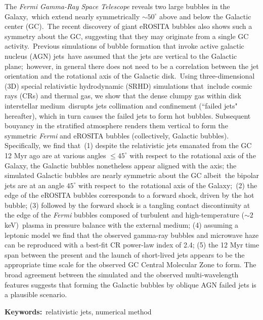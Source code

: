 \begin{abstracten}
The \textit{Fermi Gamma-Ray Space Telescope} reveals two large bubbles in the Galaxy,\
which extend nearly symmetrically $\sim50^{\circ}$ above and below the Galactic center (GC).\
The recent discovery of giant eROSITA bubbles also shows such a symmetry about the GC,
suggesting that they may originate from a single GC activity.\
Previous simulations of bubble formation that invoke active galactic nucleus (AGN) jets\
have assumed that the jets are vertical to the Galactic plane;\
however, in general there does not need to be a correlation between
the jet orientation and the rotational axis of the Galactic disk.\
Using three-dimensional (3D) special relativistic hydrodynamic (SRHD) simulations that\
include cosmic rays (CRs) and thermal gas, we show that the dense clumpy gas within disk interstellar medium\
disrupts jets collimation and confinement (``failed jets" hereafter),
which in turn causes the failed jets to form
hot bubbles. Subsequent bouyancy in the stratified atmosphere renders them vertical to form
the symmetric \textit{Fermi} and eROSITA bubbles (collectively, Galactic bubbles).
Specifically, we find that\
(1) despite the relativistic jets emanated from the GC 12 Myr ago are at various angles
$\leq 45^{\circ}$ with respect to
the rotational axis of the Galaxy, the Galactic bubbles nonetheless appear aligned with the axis;
the simulated Galactic bubbles are nearly symmetric about the GC albeit\
the bipolar jets are at an angle $45^{\circ}$ with respect to\
the rotational axis of the Galaxy;\
(2) the edge of the eROSITA bubbles corresponds to a forward shock, driven by the hot bubble;
(3) followed by the forward shock is a tangling contact discontinuity at the edge of the \textit{Fermi} bubbles
composed of turbulent and high-temperature ($\sim2$ keV)\
plasma in pressure balance with the external medium;
(4) assuming a leptonic model we find that the observed gamma-ray bubbles and microwave haze can be reproduced with
a best-fit CR power-law index of 2.4;
(5) the 12 Myr time span between the present and the launch of short-lived jets appears to be the appropriate time
scale for the observed GC Central Molecular Zone to form.
The broad agreement between the simulated and the
observed multi-wavelength features suggests that forming the Galactic bubbles by
oblique AGN failed jets is a plausible scenario.

\bigbreak
\noindent \textbf{Keywords:}{\, \makeatletter relativistic jets, numerical method \makeatother}
\end{abstracten}

\begin{comment}
\category{I2.10}{Computing Methodologies}{Artificial Intelligence --
Vision and Scene Understanding} \category{H5.3}{Information
Systems}{Information Interfaces and Presentation (HCI) -- Web-based
Interaction.}

\terms{Design, Human factors, Performance.}

\keywords{Region of interest, Visual attention model, Web-based
games, Benchmarks.}
\end{comment}
